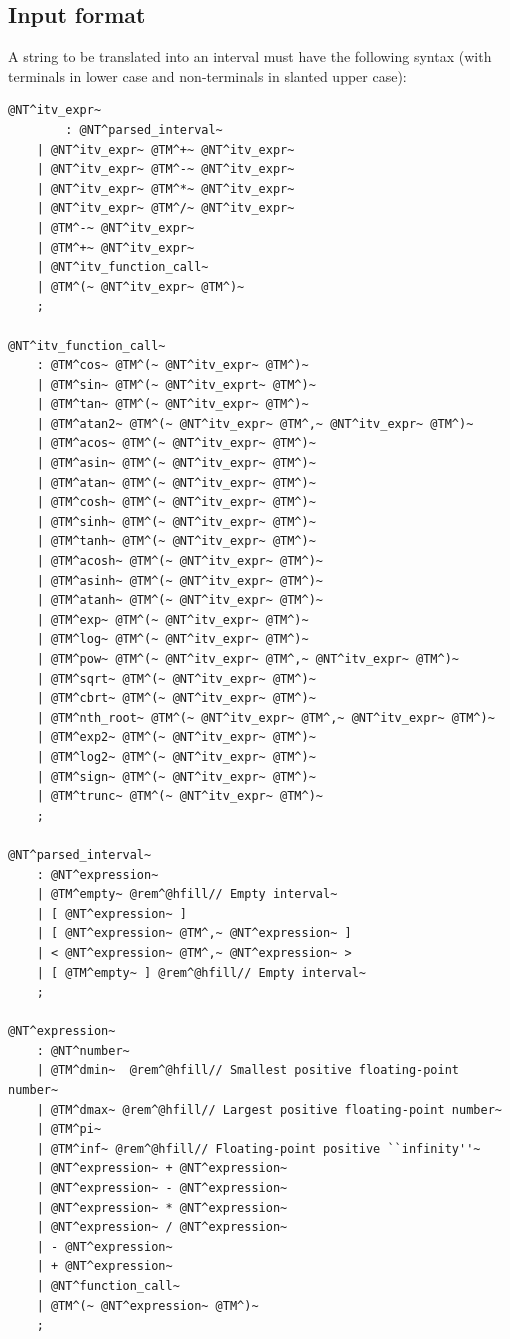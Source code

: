 \documentclass{manual}
\begin{document}
\subsection{Input format}\label{sec:input-format}

A string to be translated into an interval must have the following
syntax (with terminals in lower case and non-terminals in slanted upper case):

\begin{Verbatim}[commandchars=\@\^\~]
@NT^itv_expr~
        : @NT^parsed_interval~
	| @NT^itv_expr~ @TM^+~ @NT^itv_expr~
	| @NT^itv_expr~ @TM^-~ @NT^itv_expr~
	| @NT^itv_expr~ @TM^*~ @NT^itv_expr~
	| @NT^itv_expr~ @TM^/~ @NT^itv_expr~
	| @TM^-~ @NT^itv_expr~
	| @TM^+~ @NT^itv_expr~
	| @NT^itv_function_call~
	| @TM^(~ @NT^itv_expr~ @TM^)~
	;

@NT^itv_function_call~
	: @TM^cos~ @TM^(~ @NT^itv_expr~ @TM^)~
	| @TM^sin~ @TM^(~ @NT^itv_exprt~ @TM^)~
	| @TM^tan~ @TM^(~ @NT^itv_expr~ @TM^)~
	| @TM^atan2~ @TM^(~ @NT^itv_expr~ @TM^,~ @NT^itv_expr~ @TM^)~
	| @TM^acos~ @TM^(~ @NT^itv_expr~ @TM^)~
	| @TM^asin~ @TM^(~ @NT^itv_expr~ @TM^)~
	| @TM^atan~ @TM^(~ @NT^itv_expr~ @TM^)~
	| @TM^cosh~ @TM^(~ @NT^itv_expr~ @TM^)~
	| @TM^sinh~ @TM^(~ @NT^itv_expr~ @TM^)~
	| @TM^tanh~ @TM^(~ @NT^itv_expr~ @TM^)~
	| @TM^acosh~ @TM^(~ @NT^itv_expr~ @TM^)~
	| @TM^asinh~ @TM^(~ @NT^itv_expr~ @TM^)~
	| @TM^atanh~ @TM^(~ @NT^itv_expr~ @TM^)~
	| @TM^exp~ @TM^(~ @NT^itv_expr~ @TM^)~
	| @TM^log~ @TM^(~ @NT^itv_expr~ @TM^)~
	| @TM^pow~ @TM^(~ @NT^itv_expr~ @TM^,~ @NT^itv_expr~ @TM^)~
	| @TM^sqrt~ @TM^(~ @NT^itv_expr~ @TM^)~
	| @TM^cbrt~ @TM^(~ @NT^itv_expr~ @TM^)~
	| @TM^nth_root~ @TM^(~ @NT^itv_expr~ @TM^,~ @NT^itv_expr~ @TM^)~
	| @TM^exp2~ @TM^(~ @NT^itv_expr~ @TM^)~
	| @TM^log2~ @TM^(~ @NT^itv_expr~ @TM^)~
	| @TM^sign~ @TM^(~ @NT^itv_expr~ @TM^)~
	| @TM^trunc~ @TM^(~ @NT^itv_expr~ @TM^)~
	;

@NT^parsed_interval~
	: @NT^expression~
	| @TM^empty~ @rem^@hfill// Empty interval~
	| [ @NT^expression~ ]
	| [ @NT^expression~ @TM^,~ @NT^expression~ ]
	| < @NT^expression~ @TM^,~ @NT^expression~ >
	| [ @TM^empty~ ] @rem^@hfill// Empty interval~
	;

@NT^expression~
	: @NT^number~
	| @TM^dmin~  @rem^@hfill// Smallest positive floating-point number~
	| @TM^dmax~ @rem^@hfill// Largest positive floating-point number~
	| @TM^pi~
	| @TM^inf~ @rem^@hfill// Floating-point positive ``infinity''~
	| @NT^expression~ + @NT^expression~
	| @NT^expression~ - @NT^expression~
	| @NT^expression~ * @NT^expression~
	| @NT^expression~ / @NT^expression~
	| - @NT^expression~
	| + @NT^expression~
	| @NT^function_call~
	| @TM^(~ @NT^expression~ @TM^)~
	;


\end{Verbatim}
\end{document}
